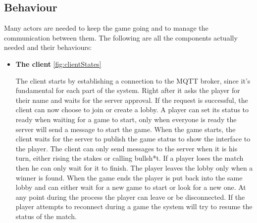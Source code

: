 \documentclass{scrartcl}
\begin{document}
\subsection{Behaviour}\label{behaviour}

Many actors are needed to keep the game going and to manage the communication between them. \newline
The following are all the components actually needed and their behaviours:
\begin{itemize}
      \item
            \textbf{The client} \cref{fig:clientStates} \par
            The client starts by establishing a connection to the MQTT broker, since it's fundamental
            for each part of the system. \newline
            Right after it asks the player for their name and waits for the server approval.
            If the request is successful, the client can now choose to join or create a lobby. \newline
            A player can set its status to ready when waiting for a game to start, only when everyone is ready
            the server will send a message to start the game. \newline
            When the game starts, the client waits for the server to publish the game status to
            show the interface to the player.
            The client can only send messages to the server when it is his turn, either rising the stakes
            or calling bullsh*t. If a player loses the match then he can only wait for it to finish.
            The player leaves the lobby only when a winner is found. When the game ends the
            player is put back into the same lobby and can either wait for a new game to start or look for a new one. \newline
            At any point during the process the player can leave or be disconnected.
            If the player attempts to reconnect during a game the system will try to resume the status of the match.
            \begin{figure}[H]
                  \centering

\end{figure}
\end{itemize}
\end{document}
